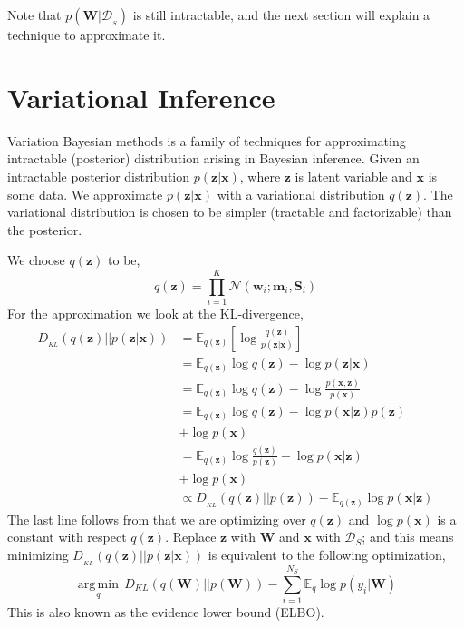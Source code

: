 \documentclass[10pt,twocolumn,letterpaper]{article}
\newcommand{\vect}[1]{\boldsymbol{\mathbf{#1}}}
\DeclareMathOperator*{\argmin}{arg\,min}
\begin{document}
Note that \(p(\vect{W}|\mathcal{D}_{_{S}})\) is still intractable, and the next section will explain a technique to approximate it.

\section{Variational Inference}
Variation Bayesian methods is a family of techniques for approximating intractable (posterior) distribution arising in Bayesian inference. 
Given an intractable posterior distribution \(p(\vect{z}|\vect{x})\), where \(\vect{z}\) is latent variable and \(\vect{x}\) is some data.
We approximate \(p(\vect{z}|\vect{x})\) with a variational distribution \(q(\vect{z})\). The variational distribution is chosen to be simpler (tractable and factorizable) than the posterior. 

We choose \(q(\vect{z})\) to be,
\[
q(\vect{z}) = \prod_{i=1}^{K} \mathcal{N}(\vect{w}_i ; \vect{m}_i, \vect{S}_i)
\]
For the approximation we look at the KL-divergence,
\begin{align*}
    D_{_{KL}}(q(\vect{z}) || p(\vect{z} | \vect{x})) &= \mathbb{E}_{q(\vect{z})} \left[ \log \frac{q(\vect{z})}{p(\vect{z} | \vect{x})} \right] \\
    &= \mathbb{E}_{q(\vect{z})} \log q(\vect{z}) - \log p(\vect{z} | \vect{x}) \\
    &= \mathbb{E}_{q(\vect{z})} \log q(\vect{z}) - \log \frac{p(\vect{x}, \vect{z})}{p(\vect{x})} \\
    &= \mathbb{E}_{q(\vect{z})} \log q(\vect{z}) - \log p(\vect{x}|\vect{z}) p(\vect{z}) \\
    &+ \log p(\vect{x})\\
    &= \mathbb{E}_{q(\vect{z})} \log \frac{q(\vect{z})}{p(\vect{z})} - \log p(\vect{x}|\vect{z}) \\
    &+ \log p(\vect{x}) \\
    &\propto D_{_{KL}}(q(\vect{z}) || p(\vect{z})) - \mathbb{E}_{q(\vect{z})} \log p(\vect{x}|\vect{z})
\end{align*}
The last line follows from that we are optimizing over \(q(\vect{z})\) and \(\log p(\vect{x})\) is a constant with respect \(q(\vect{z})\). Replace \(\vect{z}\) with \(\vect{W}\) and \(\vect{x}\) with \(\mathcal{D}_S\); and this means minimizing \(D_{_{KL}}(q(\vect{z}) || p(\vect{z} | \vect{x}))\) is equivalent to the following optimization,
\begin{equation} \label{eq:ELBO}
    \underset{q}{\argmin} \, D_{KL} (q(\vect{W}) || p(\vect{W})) - \sum_{i=1}^{N_S} \mathbb{E}_{q} \log p(y_i|\vect{W})
\end{equation}
This is also known as the evidence lower bound (ELBO).
\end{document}
